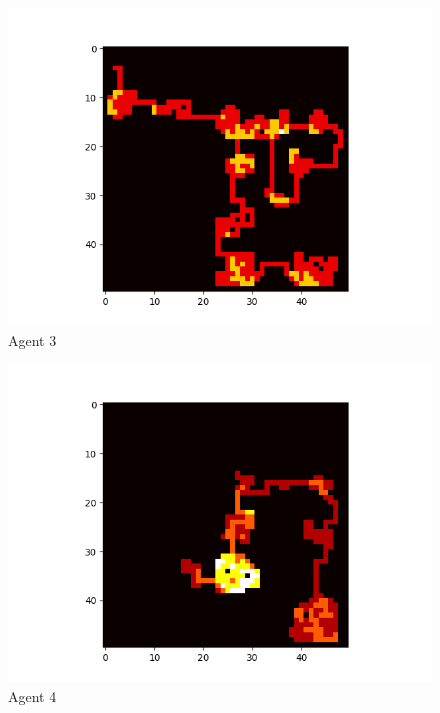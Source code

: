 \begin{figure}[!ht]
	\centering
	\includegraphics[scale=0.70]{images/test2_agent3.png}
	\caption{Agent 3}
	\label{fig:test2Agent3}
\end{figure}

\begin{figure}[!ht]
	\centering
	\includegraphics[scale=0.70]{images/test2_agent4.png}
	\caption{Agent 4}
	\label{fig:test2Agent4}
\end{figure}